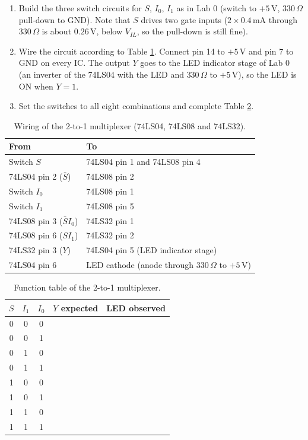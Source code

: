 \documentclass{article}
\begin{document}
\begin{enumerate}
    \item Build the three switch circuits for $S$, $I_0$, $I_1$ as in Lab 0 (switch to $+5\,\mathrm{V}$, $330\,\Omega$ pull-down to GND). Note that $S$ drives two gate inputs ($2\times 0.4\,\mathrm{mA}$ through $330\,\Omega$ is about $0.26\,\mathrm{V}$, below $V_{IL}$, so the pull-down is still fine).
    \item Wire the circuit according to Table \ref{tab:mux_wiring}. Connect pin 14 to $+5\,\mathrm{V}$ and pin 7 to GND on every IC. The output $Y$ goes to the LED indicator stage of Lab 0 (an inverter of the 74LS04 with the LED and $330\,\Omega$ to $+5\,\mathrm{V}$), so the LED is ON when $Y=1$.
    \item Set the switches to all eight combinations and complete Table \ref{tab:mux_truth}.
\end{enumerate}

\begin{table}[H]
    \centering
    \begin{tabular}{|l|l|}
        \hline
        \textbf{From} & \textbf{To} \\
        \hline
        Switch $S$ & 74LS04 pin 1 and 74LS08 pin 4 \\ \hline
        74LS04 pin 2 ($\bar{S}$) & 74LS08 pin 2 \\ \hline
        Switch $I_0$ & 74LS08 pin 1 \\ \hline
        Switch $I_1$ & 74LS08 pin 5 \\ \hline
        74LS08 pin 3 ($\bar{S} I_0$) & 74LS32 pin 1 \\ \hline
        74LS08 pin 6 ($S I_1$) & 74LS32 pin 2 \\ \hline
        74LS32 pin 3 ($Y$) & 74LS04 pin 5 (LED indicator stage) \\ \hline
        74LS04 pin 6 & LED cathode (anode through $330\,\Omega$ to $+5\,\mathrm{V}$) \\ \hline
    \end{tabular}
    \caption{Wiring of the 2-to-1 multiplexer (74LS04, 74LS08 and 74LS32).}
    \label{tab:mux_wiring}
\end{table}

\begin{table}[H]
    \centering
    \begin{tabular}{|c|c|c|c|c|}
        \hline
        $S$ & $I_1$ & $I_0$ & $Y$ expected & LED observed \\
        \hline
        0&0&0&&\\ \hline
        0&0&1&&\\ \hline
        0&1&0&&\\ \hline
        0&1&1&&\\ \hline
        1&0&0&&\\ \hline
        1&0&1&&\\ \hline
        1&1&0&&\\ \hline
        1&1&1&&\\ \hline
    \end{tabular}
    \caption{Function table of the 2-to-1 multiplexer.}
    \label{tab:mux_truth}
\end{table}
\end{document}
